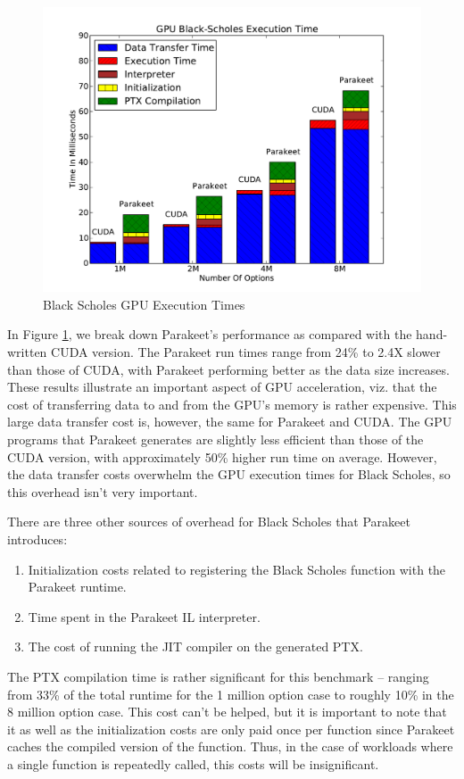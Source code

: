 \documentclass[10pt,twocolumn]{article}
\begin{document}
\begin{figure}[h!]
\includegraphics[scale=0.45]{BSNOCPU.pdf}
\caption{Black Scholes GPU Execution Times}
\label{BSGPU}
\end{figure}

In Figure \ref{BSGPU}, we break down Parakeet's performance as compared with the hand-written CUDA version.  The Parakeet run times range from 24\% to 2.4X slower than those of CUDA, with Parakeet performing better as the data size increases.  These results illustrate an important aspect of GPU acceleration, viz. that the cost of transferring data to and from the GPU's memory is rather expensive.  This large data transfer cost is, however, the same for Parakeet and CUDA.  The GPU programs that Parakeet generates are slightly less efficient than those of the CUDA version, with approximately 50\% higher run time on average.  However, the data transfer costs overwhelm the GPU execution times for Black Scholes, so this overhead isn't very important. 

 There are three other sources of overhead for Black Scholes that Parakeet introduces:
\begin{enumerate}
\item Initialization costs related to registering the Black Scholes function with the Parakeet runtime.
\item Time spent in the Parakeet IL interpreter.
\item The cost of running the JIT compiler on the generated PTX.
\end{enumerate}

The PTX compilation time is rather significant for this benchmark -- ranging from 33\% of the total runtime for the 1 million option case to roughly 10\% in the 8 million option case.  This cost can't be helped, but it is important to note that it as well as the initialization costs are only paid once per function since Parakeet caches the compiled version of the function.  Thus, in the case of workloads where a single function is repeatedly called, this costs will be insignificant.
\end{document}
